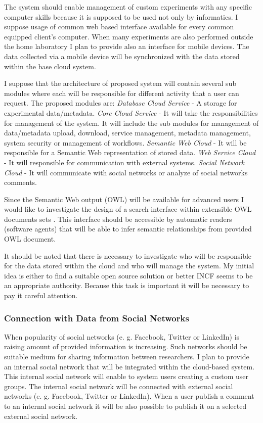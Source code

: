 \documentclass[a4paper, 10pt]{article}
\begin{document}
The system should enable management of custom experiments with any specific computer skills because it is supposed to be used not only by informatics. I suppose usage of common web based interface available for every common equipped client's computer. When many experiments are also performed outside the home laboratory I plan to provide also an interface for mobile devices. The data collected via a mobile device will be synchronized with the data stored within the base cloud system.

I suppose that the architecture of proposed system will contain several sub modules where each will be responsible for different activity that a user can request. The proposed modules are: \textit{Database Cloud Service} - A storage for experimental data/metadata. \textit{Core Cloud Service} - It will take the responsibilities for management of the system. It will include the sub modules for management of data/metadata upload, download, service management, metadata management, system security or management of workflows. \textit{Semantic Web Cloud} - It will be responsible for a Semantic Web representation of stored data. \textit{Web Service Cloud} - It will responsible for communication with external systems. \textit{Social Network Cloud} - It will communicate with social networks or analyze of social networks comments.

Since the Semantic Web output (OWL) will be available for advanced users I would like to investigate the design of a search interface within extensible OWL documents sets . This interface should be accessible by automatic readers (software agents) that will be able to infer semantic relationships from provided OWL document.

It should be noted that there is necessary to investigate who will be responsible for the data stored within the cloud and who will manage the system. My initial idea is either to find a suitable open source solution or better INCF seems to be an appropriate authority. Because this task is important it will be  necessary to pay it careful attention.

\subsubsection*{Connection with Data from Social Networks}

When popularity of social networks  (e. g. Facebook, Twitter or LinkedIn) is raising amount of provided information is increasing. Such networks should be suitable medium for sharing information between researchers. I plan to provide an internal social network that will be integrated within the cloud-based system. This internal social network will enable to system users creating a custom user groups. The internal social network will be connected with external social networks (e. g. Facebook, Twitter or LinkedIn). When a user publish a comment to an internal social network it will be also possible to publish it on a selected external social network.
\end{document}
